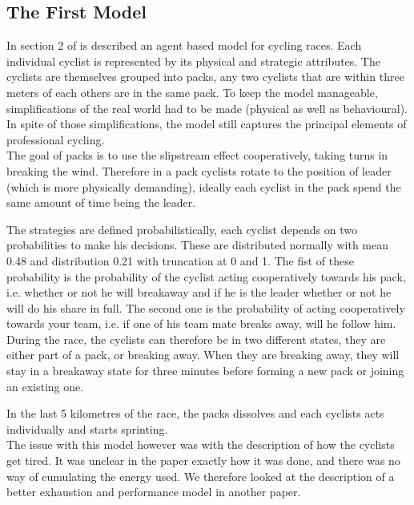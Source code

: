 \documentclass[10pt, a4paper]{report}
\begin{document}
\subsection{The First Model}\label{subsec:model1}

In section 2 of \cite{AgentModel} is described an agent based model for cycling races. Each individual cyclist is represented by its physical and strategic attributes. The cyclists are themselves grouped into packs, any two cyclists that are within three meters of each others are in the same pack. To keep the model manageable, simplifications of the real world had to be made (physical as well as behavioural). In spite of those simplifications, the model still captures the principal elements of professional cycling. \\

The goal of packs is to use the slipstream effect cooperatively, taking turns in breaking the wind. Therefore in a pack cyclists rotate to the position of leader (which is more physically demanding), ideally each cyclist in the pack spend the same amount of time being the leader.

The strategies are defined probabilistically, each cyclist depends on two probabilities to make his decisions. These are distributed normally with mean 0.48 and distribution 0.21 with truncation at 0 and 1. The fist of these probability is the probability of the cyclist acting cooperatively towards his pack, i.e. whether or not he will breakaway and if he is the leader whether or not he will do his share in full. The second one is the probability of acting cooperatively towards your team, i.e. if one of his team mate breaks away, will he follow him. \\

During the race, the cyclists can therefore be in two different states, they are either part of a pack, or breaking away. When they are breaking away, they will stay in a breakaway state for three minutes before forming a new pack or joining an existing one.

In the last 5 kilometres of the race, the packs dissolves and each cyclists acts individually and starts sprinting. \\

The issue with this model however was with the description of how the cyclists get tired. It was unclear in the paper exactly how it was done, and there was no way of cumulating the energy used. We therefore looked at the description of a better exhaustion and performance model in another paper.
\end{document}
